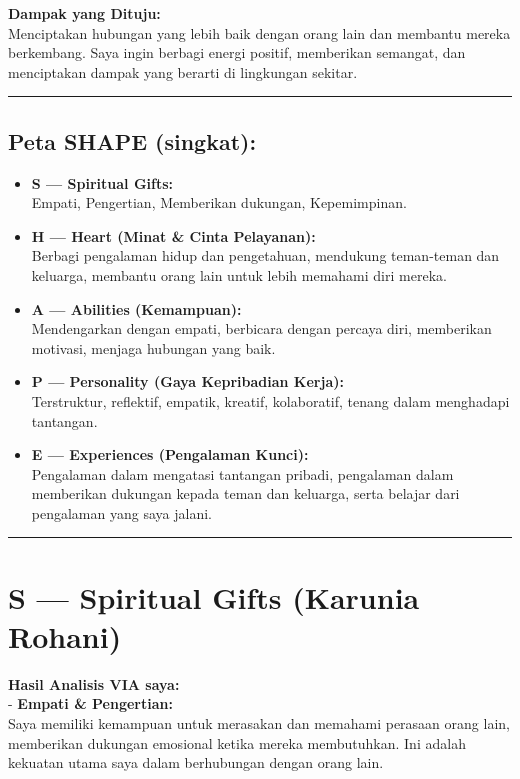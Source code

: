 \documentclass[
  letterpaper,
  DIV=11,
  numbers=noendperiod]{scrreprt}
\begin{document}
\textbf{Dampak yang Dituju:}\\
Menciptakan hubungan yang lebih baik dengan orang lain dan membantu
mereka berkembang. Saya ingin berbagi energi positif, memberikan
semangat, dan menciptakan dampak yang berarti di lingkungan sekitar.

\begin{center}\rule{0.5\linewidth}{0.5pt}\end{center}

\subsection{Peta SHAPE (singkat):}\label{peta-shape-singkat}

\begin{itemize}
\item
  \textbf{S --- Spiritual Gifts:}\\
  Empati, Pengertian, Memberikan dukungan, Kepemimpinan.
\item
  \textbf{H --- Heart (Minat \& Cinta Pelayanan):}\\
  Berbagi pengalaman hidup dan pengetahuan, mendukung teman-teman dan
  keluarga, membantu orang lain untuk lebih memahami diri mereka.
\item
  \textbf{A --- Abilities (Kemampuan):}\\
  Mendengarkan dengan empati, berbicara dengan percaya diri, memberikan
  motivasi, menjaga hubungan yang baik.
\item
  \textbf{P --- Personality (Gaya Kepribadian Kerja):}\\
  Terstruktur, reflektif, empatik, kreatif, kolaboratif, tenang dalam
  menghadapi tantangan.
\item
  \textbf{E --- Experiences (Pengalaman Kunci):}\\
  Pengalaman dalam mengatasi tantangan pribadi, pengalaman dalam
  memberikan dukungan kepada teman dan keluarga, serta belajar dari
  pengalaman yang saya jalani.
\end{itemize}

\begin{center}\rule{0.5\linewidth}{0.5pt}\end{center}

\section{S --- Spiritual Gifts (Karunia
Rohani)}\label{s-spiritual-gifts-karunia-rohani}

\textbf{Hasil Analisis VIA saya:}\\
- \textbf{Empati \& Pengertian:}\\
Saya memiliki kemampuan untuk merasakan dan memahami perasaan orang
lain, memberikan dukungan emosional ketika mereka membutuhkan. Ini
adalah kekuatan utama saya dalam berhubungan dengan orang lain.
\end{document}
